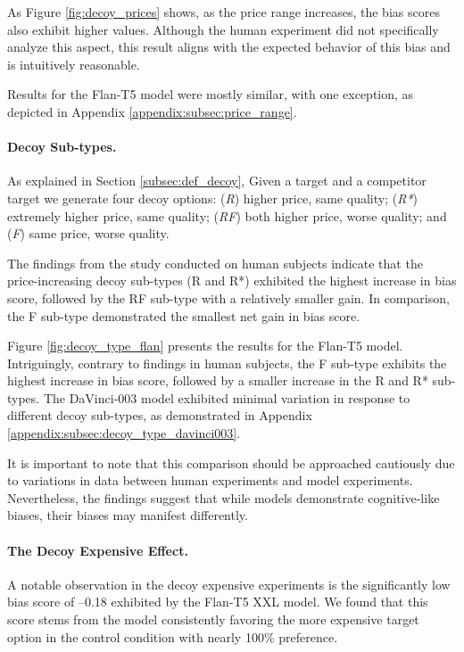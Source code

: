 As Figure \ref{fig:decoy_prices} shows, as the price range increases, the bias scores also exhibit higher values.
Although the human experiment did not specifically analyze this aspect, this result aligns with the expected behavior of this bias and is intuitively reasonable.


Results for the Flan-T5 model were mostly similar, with one exception, as depicted in Appendix \ref{appendix:subsec:price_range}.


\paragraph{Decoy Sub-types.}
As explained in Section \ref{subsec:def_decoy}, Given a target and a competitor target we generate four decoy options: (\textit{R}) higher price, same quality;
(\textit{R*}) extremely higher price, same quality;
(\textit{RF})  both higher price, worse quality; and (\textit{F})  same price, worse quality.

The findings from the study conducted on human subjects \citep{huber1982adding} indicate that the price-increasing decoy sub-types (R and R*) exhibited the highest increase in bias score, followed by the RF sub-type with a relatively smaller gain.
In comparison, the F sub-type demonstrated the smallest net gain in bias score.


Figure \ref{fig:decoy_type_flan} presents the results for the Flan-T5 model.
Intriguingly,  contrary to findings in human subjects, the F sub-type exhibits the highest increase in bias score, followed by a smaller increase in the R and R* sub-types.
The DaVinci-003 model exhibited minimal variation in response to different decoy sub-types, as demonstrated in Appendix \ref{appendix:subsec:decoy_type_davinci003}.

It is important to note that this comparison should be approached cautiously due to variations in data between human experiments and model experiments.
Nevertheless, the findings suggest that while models demonstrate cognitive-like biases, their biases may manifest differently.

\paragraph{The Decoy Expensive Effect.}

A notable observation in the decoy expensive experiments is the significantly low bias score of --0.18 exhibited by the Flan-T5 XXL model.
We found that this score stems from the model consistently favoring the more expensive target option in the control condition with nearly 100\% preference. 

